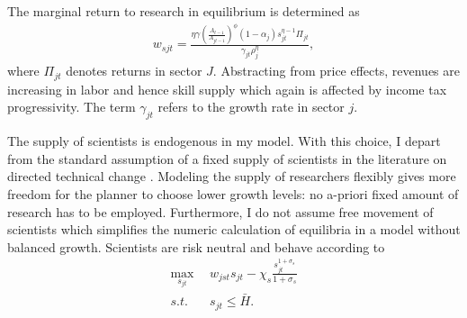 The marginal return to research in equilibrium is determined as
\begin{align}
w_{sjt}= \frac{\eta \gamma \left(\frac{A_{t-1}}{A_{jt-1}}\right)^\phi (1-\alpha_j)s_{jt}^{\eta-1}\Pi_{jt}}{\gamma_{jt}\rho_j^\eta},
\end{align}
where $\Pi_{jt}$ denotes returns in sector $J$. Abstracting from price effects, revenues are increasing in labor and hence skill supply which again is affected by income tax progressivity. The term $\gamma_{jt}$ refers to the growth rate in sector $j$.

The supply of scientists is endogenous in my model. With this choice, I depart from the standard assumption of a fixed supply of scientists in the literature on directed technical change \cite{Acemoglu2012TheChange, Fried2018ClimateAnalysis}.  Modeling the supply of researchers flexibly gives more freedom for the planner to choose lower growth levels: no a-priori fixed amount of research has to be employed. Furthermore, I do not assume free movement of scientists which simplifies the numeric calculation of equilibria in a model without balanced growth. 
Scientists are risk  neutral and behave according to 
\begin{align}
\underset{s_{jt}}{\max}\ \ & w_{jst}s_{jt}-\chi_s \frac{s_{jt}^{1+\sigma_s}}{1+\sigma_s}\\
s.t. \ \ & s_{jt}\leq \bar{H}.
\end{align}

